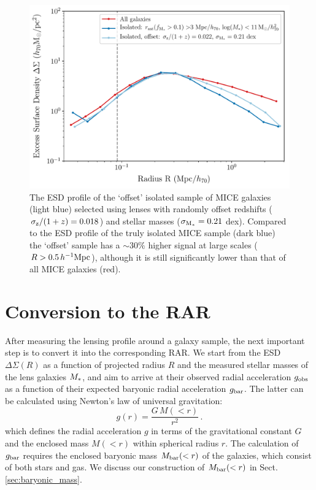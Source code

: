 \documentclass[usenatbib]{mnras}
\newcommand{\hMpc}{\, h^{-1}{\rm{Mpc}} }
\newcommand{\un}[1]{_{\rm #1}}
\begin{document}
\begin{figure}
	\includegraphics[width=1.0\columnwidth]{Figures/ESD_MICE_isotest_offset.pdf}
	\caption{The ESD profile of the `offset' isolated sample of MICE galaxies (light blue) selected using lenses with randomly offset redshifts ($\sigma\un{z}/(1+z) = 0.018$) and stellar masses ($\sigma\un{M_*} = 0.21$ dex). Compared to the ESD profile of the truly isolated MICE sample (dark blue) the `offset' sample has a $\sim30\%$ higher signal at large scales ($R > 0.5 \hMpc$), although it is still significantly lower than that of all MICE galaxies (red).}
	\label{fig:isolation_test_offset}
\end{figure}


\section{Conversion to the RAR}
\label{sec:conversion}

After measuring the lensing profile around a galaxy sample, the next important step is to convert it into the corresponding RAR. We start from the ESD $\Delta\Sigma(R)$ as a function of projected radius $R$ and the measured stellar masses of the lens galaxies $M\un{*}$, and aim to arrive at their observed radial acceleration $g\un{obs}$ as a function of their expected baryonic radial acceleration $g\un{bar}$. The latter can be calculated using Newton's law of universal gravitation:
\begin{equation}\label{eq:grav}
g(r) = \frac{G \, M(<r)}{r^2} \, .
\end{equation}
which defines the radial acceleration $g$ in terms of the gravitational constant $G$ and the enclosed mass $M(<r)$ within spherical radius $r$. The calculation of  $g\un{bar}$ requires the enclosed baryonic mass $M\un{bar}(<r)$ of the galaxies, which consist of both stars and gas. We discuss our construction of $M\un{bar}(<r)$ in Sect. \ref{sec:baryonic_mass}.
\end{document}
